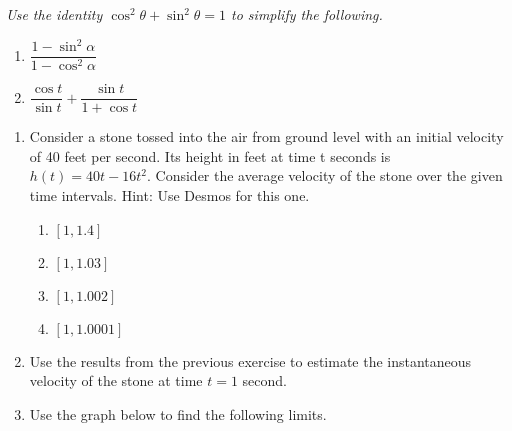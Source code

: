 \documentclass[11pt]{article}
\begin{document}
\noindent
\textit{Use the identity $\cos^2 \theta + \sin^2 \theta = 1$ to simplify the following.}
\begin{multicols}{2}
\begin{enumerate}
\setcounter{enumi}{\theenumCount}
\item $\dfrac{1-\sin^2 \alpha}{1- \cos^2 \alpha}$
\item $\dfrac{\cos t}{\sin t} + \dfrac{\sin t}{1+\cos t}$
\setcounter{enumCount}{\theenumi}
\end{enumerate}
\end{multicols}
\vfill

\begin{enumerate}
\setcounter{enumi}{\theenumCount}
\item Consider a stone tossed into the air from ground level with an initial velocity of 40 feet per second. Its height in feet at time t seconds is $h(t)=40t-16t^2$. Consider the average velocity of the stone over the given time intervals. Hint: Use Desmos for this one.
\begin{multicols}{4}
\begin{enumerate}
\item $[1,1.4]$
\item $[1,1.03]$
\item $[1,1.002]$
\item $[1,1.0001]$
\end{enumerate}
\end{multicols}
\vfill

\newpage
\item Use the results from the previous exercise to estimate the instantaneous velocity of the stone at time $t = 1$ second.
\vfill


\noindent 
\item Use the graph below to find the following limits. 
\begin{center}
\end{center}


\end{enumerate}
\end{document}
